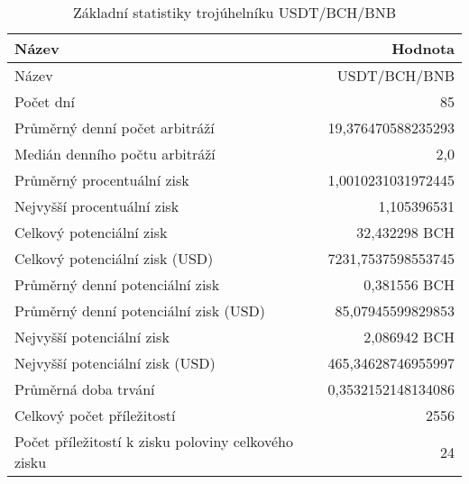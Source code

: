 \begin{table}\centering
\caption{Základní statistiky trojúhelníku USDT/BCH/BNB}
\label{USDTBCHBNB_stats}
\begin{tabular}{|| l | r ||}
\hline Název & Hodnota \\ 
\hline\hline Název & USDT/BCH/BNB \\ 
\hline Počet dní & 85 \\ 
\hline Průměrný denní počet arbitráží & 19,376470588235293 \\ 
\hline Medián denního počtu arbitráží & 2,0 \\ 
\hline Průměrný procentuální zisk & 1,0010231031972445 \\ 
\hline Nejvyšší procentuální zisk & 1,105396531 \\ 
\hline Celkový potenciální zisk & 32,432298 BCH \\ 
\hline Celkový potenciální zisk (USD) & 7231,7537598553745 \\ 
\hline Průměrný denní potenciální zisk & 0,381556 BCH \\ 
\hline Průměrný denní potenciální zisk (USD) & 85,07945599829853 \\ 
\hline Nejvyšší potenciální zisk & 2,086942 BCH \\ 
\hline Nejvyšší potenciální zisk (USD) & 465,34628746955997 \\ 
\hline Průměrná doba trvání & 0,3532152148134086 \\ 
\hline Celkový počet příležitostí & 2556 \\ 
\hline Počet příležitostí k zisku poloviny celkového zisku & 24 \\ 
\hline
\end{tabular}
\end{table}